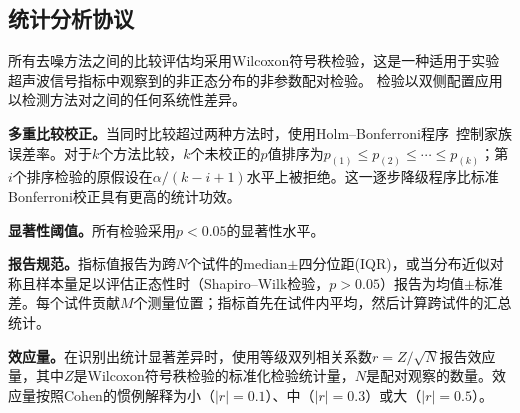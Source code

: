 \subsection{统计分析协议}
\label{sec:experiment-stats}

所有去噪方法之间的比较评估均采用Wilcoxon符号秩检验，这是一种适用于实验超声波信号指标中观察到的非正态分布的非参数配对检验。
检验以双侧配置应用以检测方法对之间的任何系统性差异。

\textbf{多重比较校正。}当同时比较超过两种方法时，使用Holm--Bonferroni程序~\cite{Holm1979}控制家族误差率。对于$k$个方法比较，$k$个未校正的$p$值排序为$p_{(1)} \leq p_{(2)} \leq \cdots \leq p_{(k)}$；第$i$个排序检验的原假设在$\alpha / (k - i + 1)$水平上被拒绝。这一逐步降级程序比标准Bonferroni校正具有更高的统计功效。

\textbf{显著性阈值。}所有检验采用$p < 0.05$的显著性水平。

\textbf{报告规范。}指标值报告为跨$N$个试件的median$\pm$四分位距(IQR)，或当分布近似对称且样本量足以评估正态性时（Shapiro--Wilk检验，$p > 0.05$）报告为均值$\pm$标准差。每个试件贡献$M$个测量位置；指标首先在试件内平均，然后计算跨试件的汇总统计。

\textbf{效应量。}在识别出统计显著差异时，使用等级双列相关系数$r = Z / \sqrt{N}$报告效应量，其中$Z$是Wilcoxon符号秩检验的标准化检验统计量，$N$是配对观察的数量。效应量按照Cohen的惯例解释为小（$|r| = 0.1$）、中（$|r| = 0.3$）或大（$|r| = 0.5$）。